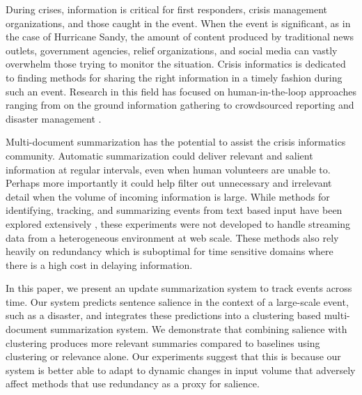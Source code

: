 \label{sec:introduction}
During crises, information is critical for first responders,
 crisis management organizations, and those caught in the event.  
When the event is significant, as in the case of Hurricane
Sandy, the amount of content produced by traditional news outlets,
government agencies, relief organizations, and social media can vastly
overwhelm those trying to monitor the situation. 
Crisis informatics \cite{palen2010vision} is dedicated to finding methods for sharing the
right information in a timely fashion during such an event.
Research in this field has focused on
human-in-the-loop approaches ranging from on the ground information 
gathering to crowdsourced reporting and disaster management \cite{starbird2013working}.

Multi-document summarization has the potential to assist the crisis 
informatics community. 
Automatic summarization could deliver
relevant and salient information at regular intervals, 
even when human volunteers are unable to. 
Perhaps more importantly it could help filter out
unnecessary and irrelevant detail when the volume of incoming information
is large. 
While methods for identifying,
tracking, and summarizing events from text based input have been explored
extensively
\cite{allan1998topic,Filatova&Hatzivassiloglou.04a,Wang&al.11}, 
these experiments were not developed to handle streaming data from a
 heterogeneous environment at web scale. 
These methods also rely heavily on redundancy which is suboptimal for time
sensitive domains where there is a high cost in delaying information.

In this paper, we present an update summarization system to track events
across time. Our system predicts sentence salience in the context of a
large-scale event, such as a disaster, and integrates these predictions into
a clustering based multi-document summarization system. 
We demonstrate that combining salience with clustering produces more relevant summaries
compared to baselines using clustering or relevance alone.  
Our experiments suggest that this
is because our system is better able to adapt to
dynamic changes in input volume that adversely 
affect methods that use redundancy as a proxy for salience. 


